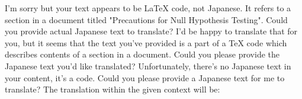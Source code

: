 \relax
\providecommand\hyper@newdestlabel[2]{}
I'm sorry but your text appears to be LaTeX code, not Japanese. It refers to a section in a document titled "Precautions for Null Hypothesis Testing". Could you provide actual Japanese text to translate?
I'd be happy to translate that for you, but it seems that the text you've provided is a part of a TeX code which describes contents of a section in a document. Could you please provide the Japanese text you'd like translated?
Unfortunately, there's no Japanese text in your content, it's a code. Could you please provide a Japanese text for me to translate?
The translation within the given context will be:

